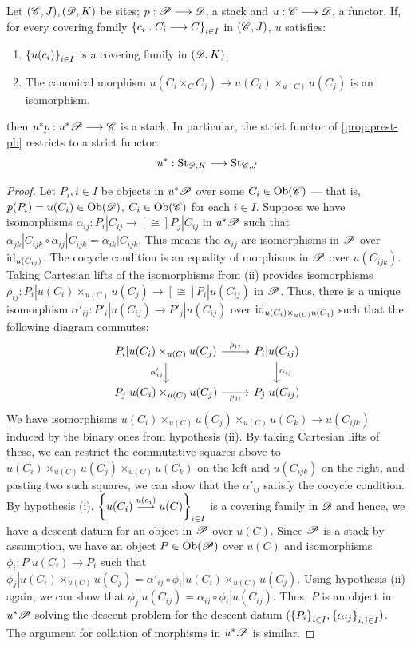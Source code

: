 \documentclass[11pt]{amsart}
\begin{document}
\begin{prop}\label{prop:cont-func}
Let $(\mathscr{C}, J), (\mathscr{D}, K)$ be sites; $p : \sP \to \sD$, a stack and $u : \sC \to \sD$, a functor.
If, for every covering family $\set{c_i : C_i \to C}_{i \in I}$ in $(\mathscr{C}, J)$, $u$ satisfies:
\begin{enumerate}
\item $\set{u(c_i)}_{i \in I}$ is a covering family in $(\mathscr{D}, K)$.
\item The canonical morphism $u(C_i \times_C C_j) \to u(C_i) \times_{u(C)} u(C_j)$ is an
isomorphism.
\end{enumerate}
then $u^*p : u^*\sP \to \sC$ is a stack. In particular, the strict functor of
\cref{prop:prest-pb} restricts to a strict functor:
\[
u^* : \St_{\sD, K} \to \St_{\sC, J}
\]
\end{prop}
\begin{proof}
Let $P_i, i \in I$ be objects in $u^*\mathscr{P}$ over some $C_i \in \Ob{\sC}$ --- that is,
$p(P_i) = u(C_i) \in \Ob{\sD}$, $C_i \in \Ob{\sC}$ for each $i \in I$.
Suppose we have isomorphisms $\alpha_{ij} : P_i|C_{ij} \to[\cong] P_j|C_{ij}$ in
$u^*\mathscr{P}$ such that $\alpha_{jk}|C_{ijk} \circ \alpha_{ij}|C_{ijk} = \alpha_{ik}|C_{ijk}$.
This means the $\alpha_{ij}$ are isomorphisms in $\mathscr{P}$ over $\mathrm{id}_{u(C_{ij})}$.
The cocycle condition is an equality of morphisms in $\mathscr{P}$ over $u(C_{ijk})$.
Taking Cartesian lifts of the isomorphisms from (ii) provides isomorphisms
$\rho_{ij} : P_{i}|u(C_i) \times_{u(C)} u(C_j) \to[\cong] P_{i}|u(C_{ij})$ in $\mathscr{P}$.
Thus, there is a unique isomorphism
$\alpha'_{ij} : P'_{i}|u(C_{ij}) \to P'_{j}|u(C_{ij})$ over
$\mathrm{id}_{u(C_i) \times_{u(C)} u(C_j)}$ such that the following diagram commutes:
\[\begin{tikzcd}
P_{i}|u(C_i) \times_{u(C)} u(C_j) \ar[r, "\rho_{ij}"] \ar[d, "\alpha'_{ij}" left] &
P_{i}|u(C_{ij}) \ar[d, "\alpha_{ij}"] \\
P_{j}|u(C_i) \times_{u(C)} u(C_j) \ar[r, "\rho_{ji}" below] &
P_{j}|u(C_{ij})
\end{tikzcd}\]
We have isomorphisms $u(C_i) \times_{u(C)} u(C_j) \times_{u(C)} u(C_k) \to u(C_{ijk})$
induced by the binary ones from hypothesis (ii). By taking Cartesian lifts of these, we can
restrict the commutative squares above to $u(C_i) \times_{u(C)} u(C_j) \times_{u(C)} u(C_k)$
on the left and $u(C_{ijk})$ on the right, and pasting two such squares, we can show that the
$\alpha'_{ij}$ satisfy the cocycle condition.
By hypothesis (i), $\set{u(C_i) \to[u(c_i)] u(C)}_{i \in I}$ is a covering family in $\mathscr{D}$ and
hence, we have a descent datum for an object in $\mathscr{P}$ over $u(C)$.
Since $\mathscr{P}$ is a stack by assumption, we have an object $P \in \Ob{\sP}$ over $u(C)$ and
isomorphisms $\phi_i : P|u(C_i) \to P_i$ such that
$\phi_j|u(C_i) \times_{u(C)} u(C_j) = \alpha'_{ij} \circ \phi_i|u(C_i) \times_{u(C)} u(C_j)$.
Using hypothesis (ii) again, we can show that
$\phi_j|u(C_{ij}) = \alpha_{ij} \circ \phi_i|u(C_{ij})$. Thus, $P$ is an object in
$u^*\mathscr{P}$ solving the descent problem for the descent datum
$(\set{P_i}_{i \in I}, \set{\alpha_{ij}}_{i, j \in I})$. The argument for collation of morphisms
in $u^*\mathscr{P}$ is similar.
\end{proof}
\end{document}
